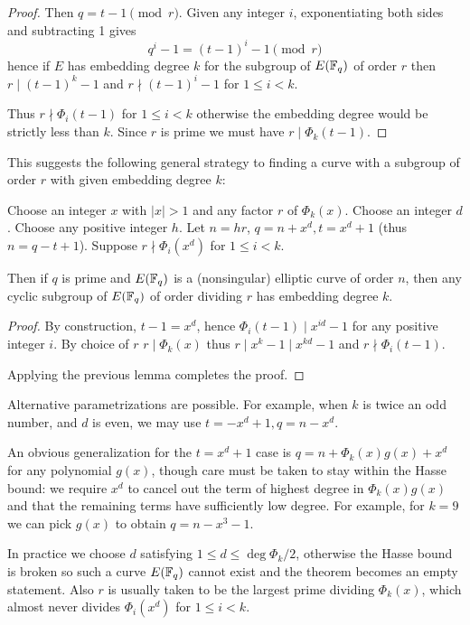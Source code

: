 \begin{proof}
Then $q = t - 1 \pmod r$. Given any integer $i$, exponentiating both sides
and subtracting 1 gives
\[ q^i - 1 = (t-1)^i -1 \pmod r \]
hence if $E$ has embedding degree $k$ for the subgroup of $E(\mathbb{F}_q)$ of order $r$
then $r \mid (t-1)^k - 1$ and $r \nmid (t-1)^i - 1$ for $1 \le i < k$.

Thus $r \nmid \Phi_i(t-1)$ for $1 \le i < k$ otherwise the embedding degree
would be strictly less than $k$. Since $r$ is prime we must have
$r \mid \Phi_k(t-1)$.
\end{proof}

This suggests the following general strategy to finding a curve with
a subgroup of order $r$ with given embedding degree $k$:

\begin{theorem}
Choose an integer $x$ with $|x| > 1$ and any factor $r$ of
$\Phi_k(x)$.
Choose an integer $d$.
Choose any positive integer $h$. Let $n = hr$, $q = n + x^d, t = x^d + 1$
(thus $n = q - t + 1$).
Suppose $r \nmid \Phi_i(x^d)$ for $1 \le i < k$.

Then if $q$ is prime and $E(\mathbb{F}_q)$ is a (nonsingular)
elliptic curve of order $n$, then
any cyclic subgroup of $E(\mathbb{F}_q)$ of order dividing
$r$ has embedding degree $k$.
\end{theorem}

\begin{proof}
By construction, $t-1 = x^d$, hence $\Phi_i(t-1) \mid x^{id} - 1$ for
any positive integer $i$.
By choice of $r$
$r \mid \Phi_k(x)$ thus $r \mid x^k - 1 \mid x^{kd} - 1$ and
$r \nmid \Phi_i(t-1)$.

Applying the previous lemma completes the proof.
\end{proof}

Alternative parametrizations are possible. For example, when $k$ is twice
an odd number, and $d$ is even, we may use $t = -x^d + 1, q = n - x^d$.

An obvious generalization for the $t = x^d + 1$ case is
$q = n + \Phi_k(x)g(x) + x^d$ for any polynomial $g(x)$, though care must
be taken to stay within the Hasse bound: we require $x^d$ to cancel out the
term of highest degree in $\Phi_k(x)g(x)$ and that the remaining terms have
sufficiently low degree. For example, for $k=9$ we can pick $g(x)$ to obtain
$q = n - x^3 - 1$.

In practice we choose $d$ satisfying $1 \le d \le \deg \Phi_k /2$,
otherwise the Hasse bound is broken so such a curve $E(\mathbb{F}_q)$ cannot exist and
the theorem becomes an empty statement.
Also $r$ is usually taken to be the largest prime dividing $\Phi_k(x)$,
which almost never divides $\Phi_i(x^d)$ for $1 \le i < k$.

